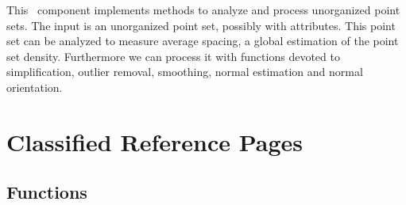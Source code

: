 


This \cgal\ component implements methods to analyze and process unorganized point sets. The input is an unorganized point set, possibly with attributes. This point set can be analyzed to measure average spacing, a global estimation of the point set density. Furthermore we can process it with functions devoted to simplification, outlier removal, smoothing, normal estimation and normal orientation. 

\section{Classified Reference Pages}

\subsection{Functions}

  \\
  \\
  \\
  \\
  \\
  \\
  \\
  \\
  \\
  \\
  \\
  \\

